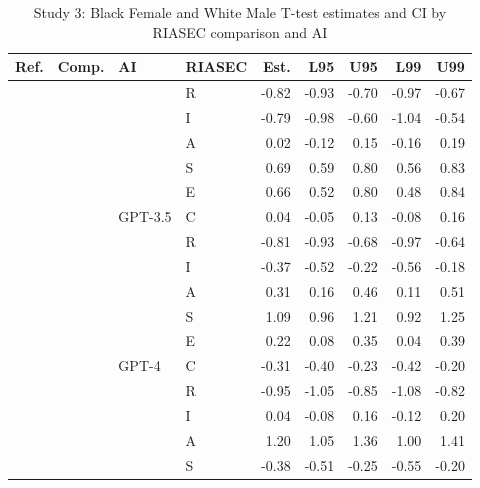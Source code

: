 \begin{table}

\caption{Study 3: Black Female and White Male T-test estimates and CI by RIASEC comparison and AI}
\centering
\fontsize{8}{10}\selectfont
\begin{tabular}[t]{llllrrrrr}
\toprule
Ref. & Comp. & AI & RIASEC & Est. & L95 & U95 & L99 & U99\\
\midrule
 &  &  & R & -0.82 & -0.93 & -0.70 & -0.97 & -0.67\\

 &  &  & I & -0.79 & -0.98 & -0.60 & -1.04 & -0.54\\

 &  &  & A & 0.02 & -0.12 & 0.15 & -0.16 & 0.19\\

 &  &  & S & 0.69 & 0.59 & 0.80 & 0.56 & 0.83\\

 &  &  & E & 0.66 & 0.52 & 0.80 & 0.48 & 0.84\\

 &  & \multirow[t]{-6}{*}{\raggedright\arraybackslash GPT-3.5} & C & 0.04 & -0.05 & 0.13 & -0.08 & 0.16\\

 &  &  & R & -0.81 & -0.93 & -0.68 & -0.97 & -0.64\\

 &  &  & I & -0.37 & -0.52 & -0.22 & -0.56 & -0.18\\

 &  &  & A & 0.31 & 0.16 & 0.46 & 0.11 & 0.51\\

 &  &  & S & 1.09 & 0.96 & 1.21 & 0.92 & 1.25\\

 &  &  & E & 0.22 & 0.08 & 0.35 & 0.04 & 0.39\\

 &  & \multirow[t]{-6}{*}{\raggedright\arraybackslash GPT-4} & C & -0.31 & -0.40 & -0.23 & -0.42 & -0.20\\

 &  &  & R & -0.95 & -1.05 & -0.85 & -1.08 & -0.82\\

 &  &  & I & 0.04 & -0.08 & 0.16 & -0.12 & 0.20\\

 &  &  & A & 1.20 & 1.05 & 1.36 & 1.00 & 1.41\\

 &  &  & S & -0.38 & -0.51 & -0.25 & -0.55 & -0.20\\


\end{tabular}
\end{table}
